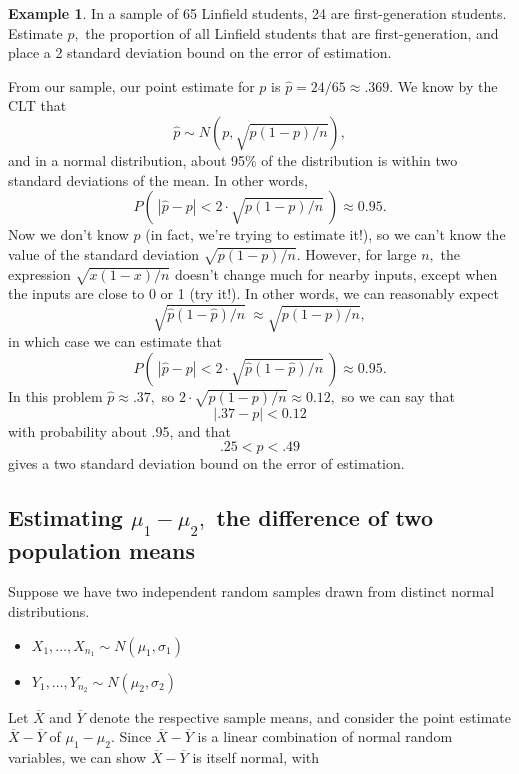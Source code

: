 \documentclass[
]{book}
\providecommand{\tightlist}{%
  \setlength{\itemsep}{0pt}\setlength{\parskip}{0pt}}
\theoremstyle{definition}
\theoremstyle{definition}
\newtheorem{example}{Example}[chapter]
\theoremstyle{definition}
\theoremstyle{definition}
\theoremstyle{remark}
\begin{document}
\begin{example}
In a sample of 65 Linfield students, 24 are first-generation students. Estimate \(p,\) the proportion of all Linfield students that are first-generation, and place a 2 standard deviation bound on the error of estimation.

From our sample, our point estimate for \(p\) is \(\hat{p} = 24/65 \approx .369.\) We know by the CLT that \[\hat{p} \sim N(p, \sqrt{p(1-p)/n}),\]
and in a normal distribution, about 95\% of the distribution is within two standard deviations of the mean. In other words,
\[P\left(~|\hat{p}-p|<2\cdot\sqrt{p(1-p)/n}~\right) \approx 0.95.\]
Now we don't know \(p\) (in fact, we're trying to estimate it!), so we can't know the value of the standard deviation \(\sqrt{p(1-p)/n}.\) However, for large \(n,\) the expression \(\sqrt{x(1-x)/n}\) doesn't change much for nearby inputs, except when the inputs are close to 0 or 1 (try it!). In other words, we can reasonably expect \[\sqrt{\hat{p}(1-\hat{p})/n} ~\approx \sqrt{p(1-p)/n},\] in which case we can estimate that
\[P\left(~|\hat{p}-p|<2\cdot\sqrt{\hat{p}(1-\hat{p})/n}~\right) \approx 0.95.\]
In this problem \(\hat{p} \approx .37,\) so \(2 \cdot \sqrt{p(1-p)/n} \approx 0.12,\) so we can say that \[|.37-p| < 0.12\] with probability about .95, and that
\[ .25 < p < .49\] gives a two standard deviation bound on the error of estimation.
\end{example}

\subsection{\texorpdfstring{Estimating \(\mu_1 - \mu_2,\) the difference of two population means}{Estimating \textbackslash mu\_1 - \textbackslash mu\_2, the difference of two population means}}\label{estimating-mu_1---mu_2-the-difference-of-two-population-means}

Suppose we have two independent random samples drawn from distinct normal distributions.

\begin{itemize}
\tightlist
\item
  \(X_1, \ldots, X_{n_1} \sim N(\mu_1,\sigma_1)\)
\item
  \(Y_1, \ldots, Y_{n_2} \sim N(\mu_2, \sigma_2)\)
\end{itemize}

Let \(\overline{X}\) and \(\overline{Y}\) denote the respective sample means, and consider the point estimate \(\overline{X}-\overline{Y}\) of \(\mu_1-\mu_2\).
Since \(\overline{X}-\overline{Y}\) is a linear combination of normal random variables, we can show \(\overline{X}-\overline{Y}\) is itself normal, with
\end{document}
